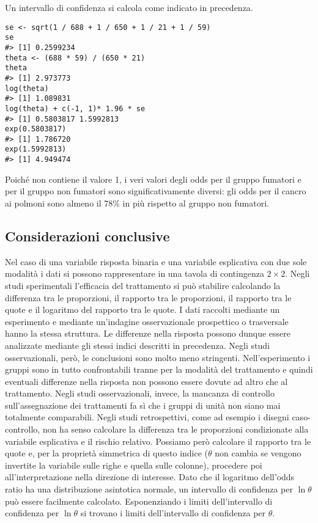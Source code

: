 Un intervallo di confidenza si calcola come indicato in precedenza.
\begin{lstlisting}
se <- sqrt(1 / 688 + 1 / 650 + 1 / 21 + 1 / 59)
se
#> [1] 0.2599234
theta <- (688 * 59) / (650 * 21)
theta
#> [1] 2.973773
log(theta)
#> [1] 1.089831
log(theta) + c(-1, 1)* 1.96 * se
#> [1] 0.5803817 1.5992813
exp(0.5803817)
#> [1] 1.786720
exp(1.5992813)
#> [1] 4.949474
\end{lstlisting}
Poiché non contiene il valore 1, i veri valori degli odds per il gruppo fumatori e per il gruppo non fumatori sono significativamente diversi: gli odds per il cancro ai polmoni sono almeno il 78\% in più rispetto al gruppo non fumatori.


\subsection*{Considerazioni conclusive}

Nel caso di una variabile risposta binaria e una variabile esplicativa con due sole modalità i dati si possono rappresentare in una tavola di contingenza $2 \times 2$.
Negli studi sperimentali l'efficacia del trattamento si può stabilire calcolando
la differenza tra le proporzioni,
il rapporto tra le proporzioni,
il rapporto tra le quote e
il logaritmo del rapporto tra le quote.
I dati raccolti mediante un esperimento e mediante un'indagine osservazionale prospettico o trasversale hanno la stessa struttura. 
Le differenze nella risposta possono dunque essere analizzate mediante gli stessi indici descritti in precedenza.
Negli studi osservazionali, però, le conclusioni sono molto meno stringenti.
Nell'esperimento i gruppi sono in tutto confrontabili tranne per la modalità del trattamento e quindi eventuali differenze nella risposta non possono essere dovute ad altro che al trattamento.
Negli studi osservazionali, invece, la mancanza di controllo sull'assegnazione dei trattamenti fa sì che  i gruppi di unità non siano mai totalmente comparabili.
Negli studi retrospettivi, come ad esempio i disegni caso-controllo, non ha senso calcolare la differenza tra le proporzioni condizionate alla variabile esplicativa e il rischio relativo.
Possiamo però calcolare il rapporto tra le quote e, per la proprietà simmetrica di questo indice ($\theta$ non cambia se vengono invertite la variabile sulle righe e quella sulle colonne), procedere poi all'interpretazione nella direzione di interesse.
Dato che il logaritmo dell'odds ratio ha una distribuzione asintotica normale, un intervallo di confidenza per $\ln \theta$ può essere facilmente calcolato.
Esponenziando i limiti dell'intervallo di confidenza per $\ln \theta$ si trovano i limiti dell'intervallo di confidenza per $\theta$.





